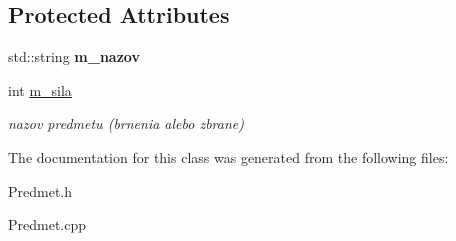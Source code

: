 \subsection*{Protected Attributes}
\begin{DoxyCompactItemize}
\item 
\hypertarget{class_predmet_aad5beccc8ba4a990a8f129f281dbc158}{std\-::string {\bfseries m\-\_\-nazov}}\label{class_predmet_aad5beccc8ba4a990a8f129f281dbc158}

\item 
\hypertarget{class_predmet_af9c5542008e72261515a10ade519e241}{int \hyperlink{class_predmet_af9c5542008e72261515a10ade519e241}{m\-\_\-sila}}\label{class_predmet_af9c5542008e72261515a10ade519e241}

\begin{DoxyCompactList}\small\item\em nazov predmetu (brnenia alebo zbrane) \end{DoxyCompactList}\end{DoxyCompactItemize}


The documentation for this class was generated from the following files\-:\begin{DoxyCompactItemize}
\item 
Predmet.\-h\item 
Predmet.\-cpp\end{DoxyCompactItemize}
